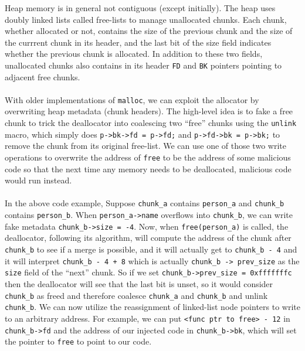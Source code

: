 \documentclass{article}
\begin{document}
Heap memory is in general not contiguous (except initially). The heap uses doubly linked lists called free-lists to manage unallocated chunks. Each chunk, whether allocated or not, contains the size of the previous chunk and the size of the currrent chunk in its header, and the last bit of the size field indicates whether the previous chunk is allocated. In addition to these two fields, unallocated chunks also contains in its header \texttt{FD} and \texttt{BK} pointers pointing to adjacent free chunks.\\\\
With older implementations of \texttt{malloc}, we can exploit the allocator by overwriting heap metadata (chunk headers). The high-level idea is to fake a free chunk to trick the deallocator into coalescing two ``free'' chunks using the \texttt{unlink} macro, which simply does \texttt{p->bk->fd = p->fd;} and \texttt{p->fd->bk = p->bk;} to remove the chunk from its original free-list. We can use one of those two write operations to overwrite the address of \texttt{free} to be the address of some malicious code so that the next time any memory needs to be deallocated, malicious code would run instead. \\\\
In the above code example, Suppose \texttt{chunk\_a} contains \texttt{person\_a} and \texttt{chunk\_b} contains \texttt{person\_b}. When \texttt{person\_a->name} overflows into \texttt{chunk\_b}, we can write fake metadata \texttt{chunk\_b->size = -4}. Now, when \texttt{free(person\_a)} is called, the deallocator, following its algorithm, will compute the address of the chunk after \texttt{chunk\_b} to see if a merge is possible, and it will actually get to \texttt{chunk\_b - 4} and it will interpret \texttt{chunk\_b - 4 + 8} which is actually \texttt{chunk\_b -> prev\_size} as the \texttt{size} field of the ``next'' chunk. So if we set \texttt{chunk\_b->prev\_size = 0xfffffffc} then the deallocator will see that the last bit is unset, so it would consider \texttt{chunk\_b} as freed and therefore coalesce \texttt{chunk\_a} and \texttt{chunk\_b} and unlink \texttt{chunk\_b}. We can now utilize the reassignment of linked-list node pointers to write to an arbitrary address. For example, we can put \texttt{<func ptr to free> - 12} in \texttt{chunk\_b->fd} and the address of our injected code in \texttt{chunk\_b->bk}, which will set the pointer to \texttt{free} to point to our code.
\section{}
\end{document}

